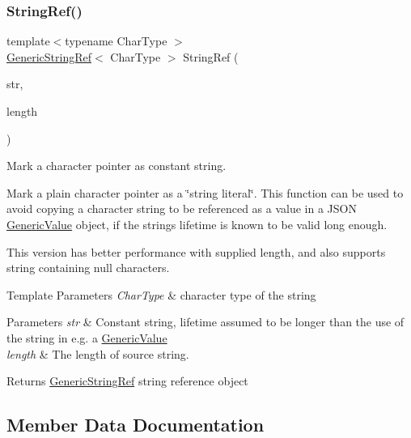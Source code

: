 \subsubsection{\texorpdfstring{String\+Ref()}{StringRef()}\hspace{0.1cm}{\footnotesize\ttfamily [2/2]}}
{\footnotesize\ttfamily template$<$typename Char\+Type $>$ \\
\hyperlink{structGenericStringRef}{Generic\+String\+Ref}$<$ Char\+Type $>$ String\+Ref (\begin{DoxyParamCaption}\item[{const Char\+Type $\ast$}]{str,  }\item[{size\+\_\+t}]{length }\end{DoxyParamCaption})\hspace{0.3cm}{\ttfamily [related]}}



Mark a character pointer as constant string. 

Mark a plain character pointer as a \char`\"{}string literal\char`\"{}. This function can be used to avoid copying a character string to be referenced as a value in a J\+S\+ON \hyperlink{classGenericValue}{Generic\+Value} object, if the string\textquotesingle{}s lifetime is known to be valid long enough.

This version has better performance with supplied length, and also supports string containing null characters.


\begin{DoxyTemplParams}{Template Parameters}
{\em Char\+Type} & character type of the string \\
\hline
\end{DoxyTemplParams}

\begin{DoxyParams}{Parameters}
{\em str} & Constant string, lifetime assumed to be longer than the use of the string in e.\+g. a \hyperlink{classGenericValue}{Generic\+Value} \\
\hline
{\em length} & The length of source string. \\
\hline
\end{DoxyParams}
\begin{DoxyReturn}{Returns}
\hyperlink{structGenericStringRef}{Generic\+String\+Ref} string reference object 
\end{DoxyReturn}


\subsection{Member Data Documentation}
\mbox{\label{structGenericStringRef_aeb7a469eea3ca2a9fd9fcb2e33df4a6c}} 
